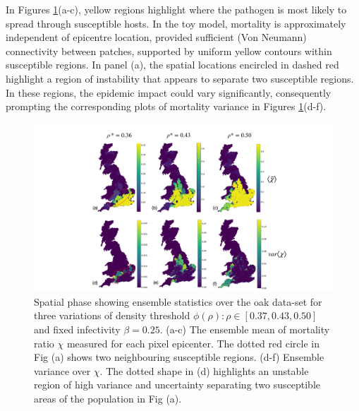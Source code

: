 In Figures \ref{fig:oak-spatial-ensemble}(a-c), yellow regions highlight where the pathogen is most 
likely to spread through susceptible hosts. In the toy model, mortality is approximately independent of epicentre location, 
provided sufficient (Von Neumann) connectivity between patches, supported by uniform yellow contours within susceptible regions.
In panel (a), the spatial locations encircled in dashed red highlight a region of instability that appears to separate two susceptible regions.
In these regions, the epidemic impact could vary significantly, 
consequently prompting the corresponding plots of mortality variance in Figures \ref{fig:oak-spatial-ensemble}(d-f).

\begin{figure}
    \centering
    \includegraphics[scale=0.4]{chapter4/figures/figure5.pdf}
    \caption{Spatial phase showing ensemble statistics over the oak data-set for three variations of density threshold $\phi(\rho): \rho \in [0.37, 0.43, 0.50]$ and fixed infectivity $\beta=0.25$. (a-c) The ensemble mean of mortality ratio $\chi$ measured for each pixel epicenter. The dotted red circle in Fig (a) shows two neighbouring susceptible regions. (d-f) Ensemble variance over $\chi$. The dotted shape in (d) highlights an unstable region of high variance and uncertainty separating two susceptible areas of the population in Fig (a).}
    \label{fig:oak-spatial-ensemble}
\end{figure}

